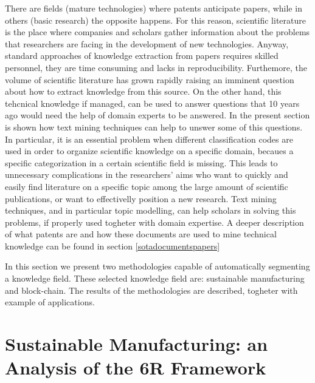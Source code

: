 \documentclass[]{book}
\begin{document}
There are fields (mature technologies) where patents anticipate papers,
while in others (basic research) the opposite happens. For this reason,
scientific literature is the place where companies and scholars gather
information about the problems that researchers are facing in the
development of new technologies. Anyway, standard approaches of
knowledge extraction from papers requires skilled personnel, they are
time consuming and lacks in reproducibility. Furthemore, the volume of
scientific literature has grown rapidly raising an imminent question
about how to extract knowledge from this source. On the other hand, this
tehcnical knowledge if managed, can be used to answer questions that 10
years ago would need the help of domain experts to be answered. In the
present section is shown how text mining techniques can help to unswer
some of this questions. In particular, it is an essential problem when
different classification codes are used in order to organize scientific
knowledge on a specific domain, becaues a specific categorization in a
certain scientific field is missing. This leads to unnecessary
complications in the researchers' aims who want to quickly and easily
find literature on a specific topic among the large amount of scientific
publications, or want to effectivelly position a new research. Text
mining techniques, and in particular topic modelling, can help scholars
in solving this problems, if properly used togheter with domain
expertise. A deeper description of what patents are and how these
documents are used to mine technical knowledge can be found in section
\ref{sotadocumentspapers}

In this section we present two methodologies capable of automatically
segmenting a knowledge field. These selected knowledge field are:
sustainable manufacturing and block-chain. The results of the
methodologies are described, togheter with example of applications.

\section{Sustainable Manufacturing: an Analysis of the 6R
Framework}\label{sustainable-manufacturing-an-analysis-of-the-6r-framework}
\end{document}
